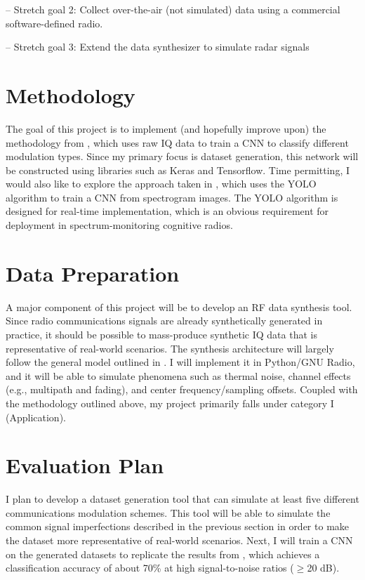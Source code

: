 \documentclass{article}
\begin{document}
-- Stretch goal 2: Collect over-the-air (not simulated) data using a commercial software-defined radio.

-- Stretch goal 3: Extend the data synthesizer to simulate radar signals

\section{Methodology}
The goal of this project is to implement (and hopefully improve upon)
the methodology from \cite{OShea2016a}, which uses raw IQ data to train a
CNN to classify different modulation types. Since my primary focus is dataset
generation, this network will be constructed using libraries such as Keras and
Tensorflow. Time permitting, I would also like to explore the approach taken
in \cite{Vagollari2021}, which uses the YOLO algorithm \cite{Redmon2016} to
train a CNN from spectrogram images. The YOLO algorithm is designed for
real-time implementation, which is an obvious requirement for deployment in
spectrum-monitoring cognitive radios.

\section{Data Preparation}
A major component of this project will be to develop an RF data
synthesis tool. Since radio communications signals are already synthetically generated in
practice, it should be possible to
mass-produce synthetic IQ data that is representative of real-world scenarios.
The synthesis architecture will largely follow the general model outlined in
\cite{OShea2016}. I will implement it in Python/GNU Radio, and it will be able
to simulate phenomena such as thermal noise, channel effects (e.g., multipath
and fading), and center frequency/sampling offsets. Coupled with
the methodology outlined above, my project primarily falls under category I (Application).

\section{Evaluation Plan}
I plan to develop a dataset generation tool that can simulate at least five
different communications modulation schemes. This tool will be able to
simulate the common signal imperfections described in the previous section in
order to make the dataset more representative of real-world scenarios. Next, I
will train a CNN on the generated datasets to replicate the results from
\cite{OShea2016a}, which achieves a classification accuracy of about 70\% at
high signal-to-noise ratios ($\geq$20 dB).



\end{document}

